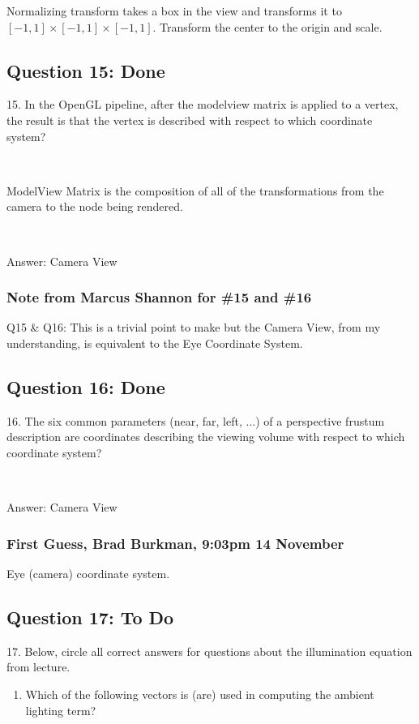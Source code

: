 \documentclass[11pt]{article}
\begin{document}
\begin{spacing}{1.2}
Normalizing transform takes a box in the view and transforms it to $[-1,1]\times [-1,1] \times [-1,1]$.  Transform the center to the origin and scale.  

\subsection{Question 15:  Done}
15.  In the OpenGL pipeline, after the modelview matrix is applied to a vertex, the result is that the vertex is described with respect to which coordinate system?

\

ModelView Matrix is the composition of all of the transformations from the camera to the
node being rendered.

\ 

Answer:  Camera View
\subsubsection{Note from Marcus Shannon for \#15 and \#16}
Q15 \& Q16: This is a trivial point to make but the Camera View, from my understanding, is equivalent to the Eye Coordinate System.

\subsection{Question 16:  Done}
16.  The six common parameters (near, far, left, $\dots$) of a perspective frustum description are coordinates describing the viewing volume with respect to which coordinate system?

\

Answer:  Camera View

\subsubsection{First Guess, Brad Burkman, 9:03pm 14 November}

Eye (camera) coordinate system.

\subsection{Question 17:  To Do}
17.  Below, circle all correct answers for questions about the illumination equation from lecture.  

\begin{enumerate}[label=\arabic*)]
	\item Which of the following vectors is (are) used in computing the ambient lighting term?
	

\end{enumerate}
\end{spacing}
\end{document}
